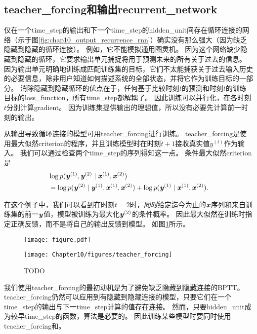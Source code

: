 
\subsection{\gls{teacher_forcing}和输出\gls{recurrent_network}}
\label{sec:teacher_forcing_and_networks_with_output_recurrence}
仅在一个\gls{time_step}的输出和下一个\gls{time_step}的\gls{hidden_unit}间存在循环连接的网络（示于图\ref{fig:chap10_output_recurrence_rnn}）确实没有那么强大（因为缺乏隐藏到隐藏的循环连接）。
例如，它不能模拟通用图灵机。
因为这个网络缺少隐藏到隐藏的循环，它要求输出单元捕捉将用于预测未来的所有关于过去的信息。
因为输出单元明确地训练成匹配训练集的目标，它们不太能捕获关于过去输入历史的必要信息，除非用户知道如何描述系统的全部状态，并将它作为训练目标的一部分。
消除隐藏到隐藏循环的优点在于，任何基于比较时刻$t$的预测和时刻$t$的训练目标的\gls{loss_function}，所有\gls{time_step}都解耦了。
因此训练可以并行化，在各时刻$t$分别计算\gls{gradient}。
因为训练集提供输出的理想值，所以没有必要先计算前一时刻的输出。

从输出导致循环连接的模型可用\gls{teacher_forcing}进行训练。
\gls{teacher_forcing}是使用最大似然\gls{criterion}的程序，并且训练模型时在时刻$t+1$接收真实值$y^{(t)}$作为输入。
我们可以通过检查两个\gls{time_step}的序列得知这一点。
条件最大似然\gls{criterion}是
\begin{align}
 &\log p(\boldsymbol{\mathit{y}}^{(1)},\boldsymbol{\mathit{y}}^{(2)} \mid \boldsymbol{\mathit{x}}^{(1)}, \boldsymbol{\mathit{x}}^{(2)} ) \\
 &= \log  p(\boldsymbol{\mathit{y}}^{(2)} \mid \boldsymbol{\mathit{y}}^{(1)}, \boldsymbol{\mathit{x}}^{(1)}, \boldsymbol{\mathit{x}}^{(2)} )  + \log p(\boldsymbol{\mathit{y}}^{(1)} \mid \boldsymbol{\mathit{x}}^{(1)}, \boldsymbol{\mathit{x}}^{(2)}) .
\end{align}


在这个例子中，我们可以看到在时刻$t=2$时，\emph{同时}给定迄今为止的$\boldsymbol{\mathit{x}}$序列和来自训练集的前一$\boldsymbol{\mathit{y}}$值，模型被训练为最大化$\boldsymbol{\mathit{y}}^{(2)}$的条件概率。
因此最大似然在训练时指定正确反馈，而不是将自己的输出反馈到模型。
如图\ref{fig:chap10_teacher_forcing}所示。
\begin{figure}[!htb]
\ifOpenSource
\centerline{\texttt{[image: figure.pdf]}}
\else
\centerline{\texttt{[image: Chapter10/figures/teacher\_forcing]}}
\fi
\caption{TODO}
\label{fig:chap10_teacher_forcing}
\end{figure}

我们使用\gls{teacher_forcing}的最初动机是为了避免缺乏隐藏到隐藏连接的\gls{BPTT}。
\gls{teacher_forcing}仍然可以应用到有隐藏到隐藏连接的模型，只要它们在一个\gls{time_step}的输出与下一\gls{time_step}计算的值存在连接。
然而，只要\gls{hidden_unit}成为较早\gls{time_step}的函数，算法是必要的。
因此训练某些模型时要同时使用\gls{teacher_forcing}和。

